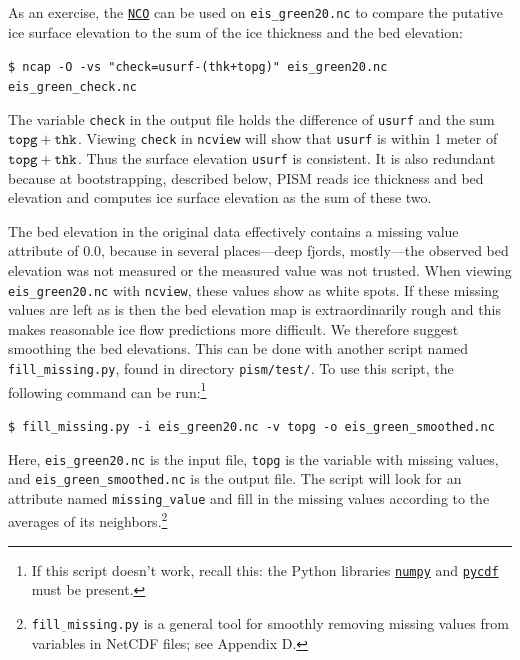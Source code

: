 \documentclass[11pt,final]{amsart}
\newcommand{\und}{$\underline{\,\,\,}$}
\begin{document}
As an exercise, the \href{http://nco.sourceforge.net/}{\texttt{NCO}} can be used on \verb|eis_green20.nc| to compare the putative ice surface elevation to the sum of the ice thickness and the bed elevation:

\verb|$ ncap -O -vs "check=usurf-(thk+topg)" eis_green20.nc eis_green_check.nc|

\noindent The variable \verb|check| in the output file holds the difference of \verb|usurf| and the sum $\verb|topg|+\verb|thk|$.  Viewing \verb|check| in \verb|ncview| will show that \verb|usurf| is within 1 meter of $\verb|topg|+\verb|thk|$.  Thus the surface elevation \verb|usurf| is consistent.  It is also redundant because at bootstrapping, described below, PISM reads ice thickness and bed elevation and computes ice surface elevation as the sum of these two.

The bed elevation in the original data effectively contains a missing value attribute of $0.0$, because in several places---deep fjords, mostly---the observed bed elevation was not measured or the measured value was not trusted.  When viewing \verb|eis_green20.nc| with \verb|ncview|, these values show as white spots.  If these missing values are left as is then the bed elevation map is extraordinarily rough and this makes reasonable ice flow predictions more difficult.  We therefore suggest smoothing the bed elevations.  This can be done with another script named \verb|fill_missing.py|, found in directory \verb|pism/test/|. To use this script, the following command can be run:\footnote{If this script doesn't work, recall this: the Python libraries \href{http://numpy.scipy.org/}{\texttt{numpy}} and \href{http://pysclint.sourceforge.net/pycdf/}{\texttt{pycdf}} must be present.}

\verb|$ fill_missing.py -i eis_green20.nc -v topg -o eis_green_smoothed.nc|

\noindent Here, \verb|eis_green20.nc| is the input file, \verb|topg| is the variable with missing values, and \verb|eis_green_smoothed.nc| is the output file. The script will look for an attribute named \verb|missing_value| and fill in the missing values according to the averages of its neighbors.\footnote{\texttt{fill\und missing.py} is a general tool for smoothly removing missing values from variables in NetCDF files; see Appendix D.}
\end{document}
